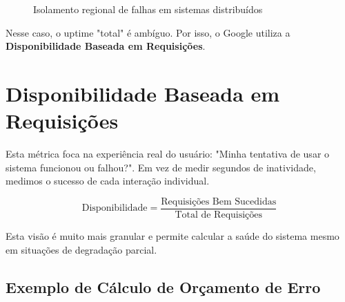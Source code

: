 \documentclass[12pt,a4paper,twoside]{report}
\begin{document}
\begin{figure}[h]
    \centering
    \caption{Isolamento regional de falhas em sistemas distribuídos}
    \label{fig:distribuido}
\end{figure}

Nesse caso, o uptime "total" é ambíguo. Por isso, o Google utiliza a \textbf{Disponibilidade Baseada em Requisições}.

\section{Disponibilidade Baseada em Requisições}

Esta métrica foca na experiência real do usuário: "Minha tentativa de usar o sistema funcionou ou falhou?". Em vez de medir segundos de inatividade, medimos o sucesso de cada interação individual.

\begin{equation}
\text{Disponibilidade} = \frac{\text{Requisições Bem Sucedidas}}{\text{Total de Requisições}}
\end{equation}

Esta visão é muito mais granular e permite calcular a saúde do sistema mesmo em situações de degradação parcial.

\subsection{Exemplo de Cálculo de Orçamento de Erro}
\end{document}
